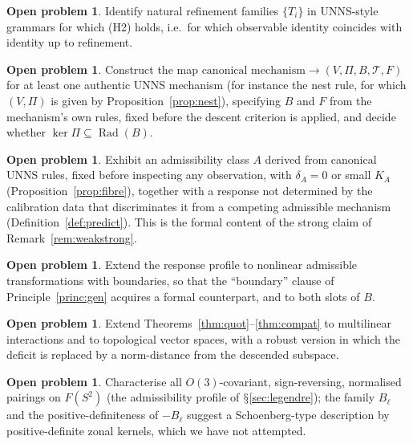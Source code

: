 \documentclass[11pt,a4paper]{article}
\renewcommand{\S}{\ensuremath{\mathsection}}
\newcommand{\Rad}{\operatorname{Rad}}
\newcommand{\defic}{\delta}
\theoremstyle{plain}
\theoremstyle{definition}
\newtheorem{problem}[theorem]{Open problem}
\begin{document}
\begin{problem}
Identify natural refinement families $\{T_i\}$ in UNNS-style grammars for which (H2) holds, i.e.\ for which observable identity coincides with identity up to refinement.
\end{problem}
\begin{problem}\label{prob:bridge}
Construct the map $\text{canonical mechanism}\to(V,\Pi,B,\mathcal T,F)$ for at least one authentic UNNS mechanism (for instance the nest rule, for which $(V,\Pi)$ is given by Proposition~\ref{prop:nest}), specifying $B$ and $F$ from the mechanism's own rules, fixed before the descent criterion is applied, and decide whether $\ker\Pi\subseteq\Rad(B)$.
\end{problem}
\begin{problem}\label{prob:strong}
Exhibit an admissibility class $A$ derived from canonical UNNS rules, fixed before inspecting any observation, with $\defic_A=0$ or small $K_A$ (Proposition~\ref{prop:fibre}), together with a response not determined by the calibration data that discriminates it from a competing admissible mechanism (Definition~\ref{def:predict}). This is the formal content of the strong claim of Remark~\ref{rem:weakstrong}.
\end{problem}
\begin{problem}
Extend the response profile to nonlinear admissible transformations with boundaries, so that the ``boundary'' clause of Principle~\ref{princ:gen} acquires a formal counterpart, and to both slots of $B$.
\end{problem}
\begin{problem}
Extend Theorems~\ref{thm:quot}--\ref{thm:compat} to multilinear interactions and to topological vector spaces, with a robust version in which the deficit is replaced by a norm-distance from the descended subspace.
\end{problem}
\begin{problem}
Characterise all $O(3)$-covariant, sign-reversing, normalised pairings on $F(S^2)$ (the admissibility profile of \S\ref{sec:legendre}); the family $B_\ell$ and the positive-definiteness of $-B_\ell$ suggest a Schoenberg-type description by positive-definite zonal kernels, which we have not attempted.
\end{problem}
\end{document}

